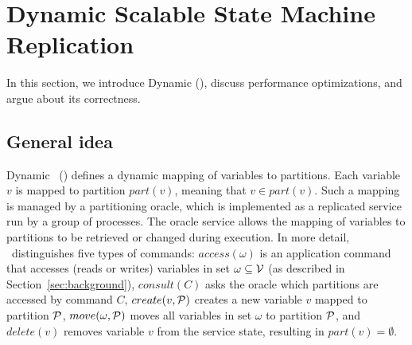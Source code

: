\section{Dynamic Scalable State Machine Replication}

In this section, we introduce Dynamic \ssmr{} (\dssmr), discuss performance optimizations, and argue about its correctness.

\subsection{General idea}
\label{sec:generalidea}

%

Dynamic \ssmr\ (\dssmr) defines a dynamic mapping of variables to partitions.
Each variable $v$ is mapped to partition $part(v)$, meaning that $v \in part(v)$.
Such a mapping is managed by a partitioning oracle, which is implemented as a replicated service run by a group of processes.
The oracle service allows the mapping of variables to partitions to be retrieved or changed during execution.
In more detail, \dssmr\ distinguishes five types of commands:
$access(\omega)$ is an application command that accesses (reads or writes) variables in set $\omega \subseteq \mathcal{V}$ (as described in Section~\ref{sec:background}),
$consult(C)$ asks the oracle which partitions are accessed by command $C$,
$create(v, \mathcal{P})$ creates a new variable $v$ mapped to partition $\mathcal{P}$,
$move(\omega,\mathcal{P})$ moves all variables in set $\omega$ to partition $\mathcal{P}$,
and $delete(v)$ removes variable $v$ from the service state, resulting in $part(v) = \emptyset$.


